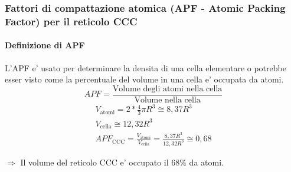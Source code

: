 \documentclass{article}
\begin{document}
            \subsubsection{Fattori di compattazione atomica (APF - Atomic Packing Factor) per il reticolo CCC}
                \paragraph{Definizione di APF} L'APF e' usato per determinare la densita di una cella elementare o potrebbe esser visto come la percentuale del volume in una cella e' occupata da atomi. 
                \begin{equation}
                    APF = \frac{\text{Volume degli atomi nella cella}}{\text{Volume nella cella}}
                \end{equation}
                \begin{gather}
                    V_\text{atomi} = 2 * \frac{4}{3} \pi R^3 \cong 8,37 R^3 \\
                    V_\text{cella} \cong 12,32 R^3 \\
                    APF_\text{CCC} = \frac{V_\text{atomi}}{V_\text{cella}} = \frac{8,37 R^3}{12,32 R^3} \cong 0,68
                \end{gather}

                $\Longrightarrow$ Il volume del reticolo CCC e' occupato il 68\% da atomi.
            
\end{document}
